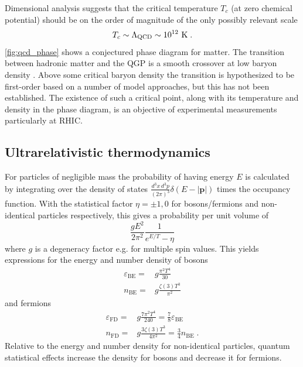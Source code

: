 Dimensional analysis suggests that the critical temperature $T_c$ (at zero chemical potential) should be on the order of magnitude of the only possibly relevant scale
\[
T_c \sim \Lambda_\textrm{QCD} \sim 10^{12}~\mathrm{K}\; .
\]
\cref{fig:qcd_phase} shows a conjectured phase diagram for \qcd matter.
The transition between hadronic matter and the QGP is a smooth crossover at low baryon density \cite{Aoki:2006we}.
Above some critical baryon density the transition is hypothesized to be first-order based on a number of model approaches, but this has not been established.
The existence of such a critical point, along with its temperature and density in the phase diagram, is an objective of experimental measurements particularly at \ac{RHIC}.

\subsection{Ultrarelativistic thermodynamics}
For particles of negligible mass the probability of having energy $E$ is calculated by integrating over the density of states \( \frac{d^3 x \, d^3 p}{(2\pi)^3} \delta\left( E - |\mathbf{p}|\right)\) times the occupancy function.
With the statistical factor $\eta = \pm 1, 0$ for bosons/fermions and non-identical particles respectively, this gives a probability per unit volume of
\begin{equation}
\frac{g E^2}{2\pi^2} \frac{1}{e^{E/T} - \eta}
\end{equation}
where $g$ is a degeneracy factor e.g. for multiple spin values.
This yields expressions for the energy and number density of bosons
\begin{align}
  \varepsilon_\textrm{BE} =& g\frac{\pi^2 T^4}{30} \\
  n_\textrm{BE} =& g\frac{\zeta(3) T^3}{\pi^2}
\end{align}
and fermions
\begin{align}
  \varepsilon_\textrm{FD} =& g\frac{7 \pi^2 T^4}{240} = \frac{7}{8} \varepsilon_\textrm{BE} \\
  n_\textrm{FD} =& g\frac{3 \zeta(3) T^3}{4 \pi^2} = \frac{3}{4} n_\textrm{BE} \; .
\end{align}
Relative to the energy and number density for non-identical particles, quantum statistical effects increase the density for bosons and decrease it for fermions.

